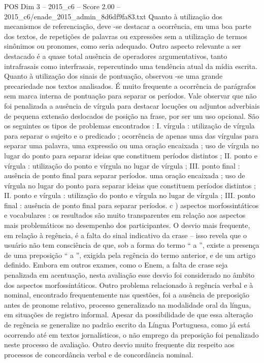 \begin{textsample}{POS Dim 3 – 2015\_c6 – Score 2.00 – 2015\_c6/enade\_2015\_admin\_8d6df9fa83.txt}
Quanto à utilização dos mecanismos de referenciação, deve -se destacar a ocorrência, em uma boa parte dos textos, de repetições de palavras ou expressões sem a utilização de termos sinônimos ou pronomes, como seria adequado.
Outro aspecto relevante a ser destacado é a quase total ausência de operadores argumentativos, tanto intrafrasais como interfrasais, repercutindo uma tendência atual da mídia escrita.
Quanto à utilização dos sinais de pontuação, observou -se uma grande precariedade nos textos analisados.
É muito frequente a ocorrência de parágrafos sem marca interna de pontuação para separar os períodos.
Vale observar que não foi penalizada a ausência de vírgula para destacar locuções ou adjuntos adverbiais de pequena extensão deslocados de posição na frase, por ser um uso opcional.
São os seguintes os tipos de problemas encontrados : I. vírgula : utilização de vírgula para separar o sujeito e o predicado ; ocorrência de apenas uma das vírgulas para separar uma palavra, uma expressão ou uma oração encaixada ; uso de vírgula no lugar do ponto para separar ideias que constituem períodos distintos ; II. ponto e vírgula : utilização do ponto e vírgula no lugar de vírgula ; III. ponto final : ausência de ponto final para separar períodos. uma oração encaixada ; uso de vírgula no lugar do ponto para separar ideias que constituem períodos distintos ; II. ponto e vírgula : utilização do ponto e vírgula no lugar de vírgula ; III. ponto final : ausência de ponto final para separar períodos. c ) aspectos morfossintáticos e vocabulares : os resultados são muito transparentes em relação aos aspectos mais problemáticos no desempenho dos participantes.
O desvio mais frequente, em relação à regência, é a falta do sinal indicativo da crase – isso revela que o usuário não tem consciência de que, sob a forma do termo “ a ”, existe a presença de uma preposição “ a ”, exigida pela regência do termo anterior, e de um artigo definido.
Embora em outros exames, como o Enem, a falta de crase seja penalizada em acentuação, nesta avaliação esse desvio foi considerado no âmbito dos aspectos morfossintáticos.
Outro problema relacionado à regência verbal e à nominal, encontrado frequentemente nas questões, foi a ausência de preposição antes de pronome relativo, processo generalizado na modalidade oral da língua, em situações de registro informal.
Apesar da possibilidade de que essa alteração de regência se generalize no padrão escrito da Língua Portuguesa, como já está ocorrendo até em textos jornalísticos, o não emprego da preposição foi penalizado neste processo de avaliação.
Outro desvio muito frequente diz respeito aos processos de concordância verbal e de concordância nominal.

\end{textsample}
